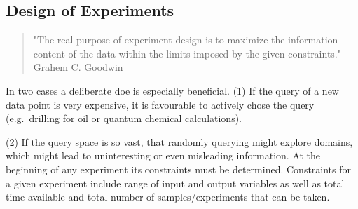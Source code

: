 \subsection{Design of Experiments} %
%
\begin{quote}
	{"The real purpose of experiment design is to maximize the information content of the data within the limits imposed by the given constraints."}
	- {Grahem C. Goodwin\cite{goodwin1977experiment}}
\end{quote}
%
In two cases a deliberate \gls{doe} is especially beneficial.
(1) If the query of a new data point is very expensive, it is favourable to actively chose the query (e.g.\ drilling for oil or quantum chemical calculations). 

(2) If the query space is so vast, that randomly querying might explore domains, which might lead to uninteresting or even misleading information.
% 
At the beginning of any experiment its constraints must be determined. 
%
Constraints for a given experiment include range of input and output variables as well as total time available and total number of samples/experiments that can be taken\cite{goodwin1977experiment}.

